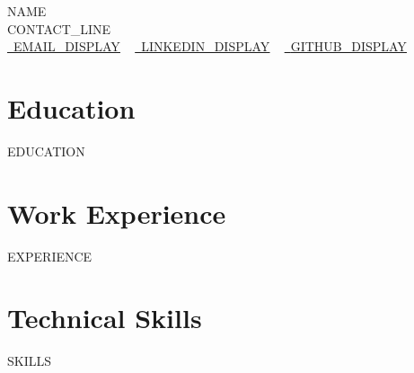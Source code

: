 \documentclass[letterpaper,11pt]{article}
\newcommand{\resumeSubHeadingListStart}{\begin{itemize}[leftmargin=0.0in, label={}]}
\newcommand{\resumeSubHeadingListEnd}{\end{itemize}}
\begin{document}
    \begin{center}
        {\Huge\scshape {{NAME}}}
        \\ {{CONTACT_LINE}}\\
        \small
        \href{mailto:{{EMAIL_URL}}}{\raisebox{-0.2\height}\faEnvelope\  \underline{{{EMAIL_DISPLAY}}}} ~
        \href{{{LINKEDIN_URL}}}{\raisebox{-0.2\height}\faLinkedin\ \underline{{{LINKEDIN_DISPLAY}}}}  ~
        \href{{{GITHUB_URL}}}{\raisebox{-0.2\height}\faGithub\ \underline{{{GITHUB_DISPLAY}}}}
    \end{center}

\section{Education}
  \resumeSubHeadingListStart
{{EDUCATION}}
  \resumeSubHeadingListEnd

\section{Work Experience}
  \resumeSubHeadingListStart
{{EXPERIENCE}}
  \resumeSubHeadingListEnd

\section{Technical Skills}
\vspace{-7pt}
\begin{itemize}
[leftmargin=0.15in, label={}]\small{\item{
{{SKILLS}}
}}
\end{itemize}
\end{document}
